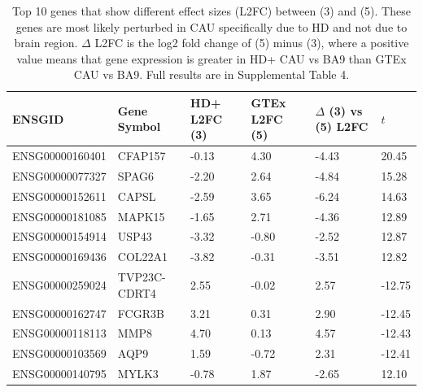 \documentclass[fleqn,10pt,table]{wlscirep}
\begin{document}
\begin{table}[ht]
    \centering
    \begin{tabular}{|l|l|l|l|l|l|}\hline
      ENSGID          & Gene Symbol  & HD+ L2FC (3) & GTEx L2FC (5) & $\Delta$ (3) vs (5) L2FC & $t$ \\ \hline
      ENSG00000160401 & CFAP157      & -0.13        & 4.30          & -4.43                    & 20.45 \\ \hline
      ENSG00000077327 & SPAG6        & -2.20        & 2.64          & -4.84                    & 15.28 \\ \hline
      ENSG00000152611 & CAPSL        & -2.59        & 3.65          & -6.24                    & 14.63 \\ \hline
      ENSG00000181085 & MAPK15       & -1.65        & 2.71          & -4.36                    & 12.89 \\ \hline
      ENSG00000154914 & USP43        & -3.32        & -0.80         & -2.52                    & 12.87 \\ \hline
      ENSG00000169436 & COL22A1      & -3.82        & -0.31         & -3.51                    & 12.82 \\ \hline
      ENSG00000259024 & TVP23C-CDRT4 & 2.55         & -0.02         & 2.57                     & -12.75 \\ \hline
      ENSG00000162747 & FCGR3B       & 3.21         & 0.31          & 2.90                     & -12.45 \\ \hline
      ENSG00000118113 & MMP8         & 4.70         & 0.13          & 4.57                     & -12.43 \\ \hline
      ENSG00000103569 & AQP9         & 1.59         & -0.72         & 2.31                     & -12.41 \\ \hline
      ENSG00000140795 & MYLK3        & -0.78        & 1.87          & -2.65                    & 12.10 \\ \hline
    \end{tabular}
    \caption{Top 10 genes that show different effect sizes (L2FC) between (3) and (5).
    These genes are most likely perturbed in CAU specifically due to HD and not due to brain region.
    $\Delta$ L2FC is the log2 fold change of (5) minus (3), where a positive value means that gene expression is greater in HD+ CAU vs BA9 than GTEx CAU vs BA9.
    Full results are in Supplemental Table 4.}
    \label{tab:ttest}
\end{table}
\end{document}
